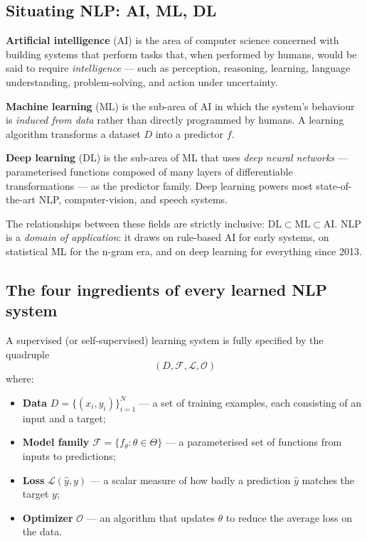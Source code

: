 \subsection{Situating NLP: AI, ML, DL}

\begin{definition}
\textbf{Artificial intelligence} (AI) is the area of computer science concerned with building systems that perform tasks that, when performed by humans, would be said to require \emph{intelligence} --- such as perception, reasoning, learning, language understanding, problem-solving, and action under uncertainty.
\end{definition}

\begin{definition}
\textbf{Machine learning} (ML) is the sub-area of AI in which the system's behaviour is \emph{induced from data} rather than directly programmed by humans. A learning algorithm transforms a dataset $D$ into a predictor $f$.
\end{definition}

\begin{definition}
\textbf{Deep learning} (DL) is the sub-area of ML that uses \emph{deep neural networks} --- parameterised functions composed of many layers of differentiable transformations --- as the predictor family. Deep learning powers most state-of-the-art NLP, computer-vision, and speech systems.
\end{definition}

The relationships between these fields are strictly inclusive: $\mathrm{DL} \subset \mathrm{ML} \subset \mathrm{AI}$. NLP is a \emph{domain of application}: it draws on rule-based AI for early systems, on statistical ML for the n-gram era, and on deep learning for everything since 2013.

\subsection{The four ingredients of every learned NLP system}

\begin{definition}
A supervised (or self-supervised) learning system is fully specified by the quadruple
\[ (D, \mathcal{F}, \mathcal{L}, \mathcal{O}) \]
where:
\begin{itemize}
    \item \textbf{Data} $D = \{(x_i, y_i)\}_{i=1}^N$ --- a set of training examples, each consisting of an input and a target;
    \item \textbf{Model family} $\mathcal{F} = \{f_\theta : \theta \in \Theta\}$ --- a parameterised set of functions from inputs to predictions;
    \item \textbf{Loss} $\mathcal{L}(\hat{y}, y)$ --- a scalar measure of how badly a prediction $\hat{y}$ matches the target $y$;
    \item \textbf{Optimizer} $\mathcal{O}$ --- an algorithm that updates $\theta$ to reduce the average loss on the data.
\end{itemize}
\end{definition}


